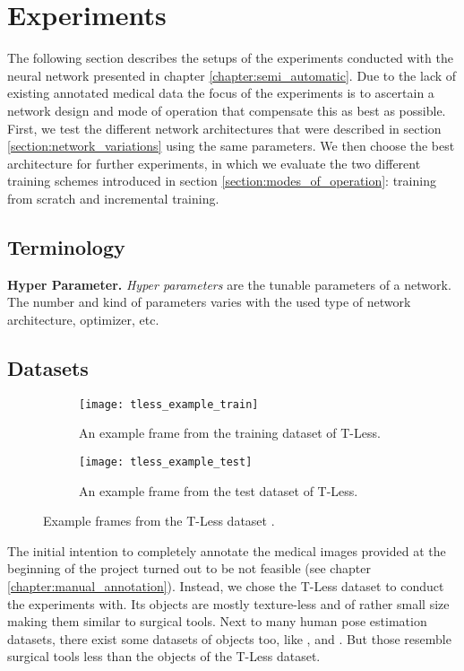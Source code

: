\chapter{Experiments} \label{chapter:experiments}

The following section describes the setups of the experiments conducted with the neural network presented in chapter \ref{chapter:semi_automatic}. Due to the lack of existing annotated medical data the focus of the experiments is to ascertain a network design and mode of operation that compensate this as best as possible. First, we test the different network architectures that were described in section \ref{section:network_variations} using the same parameters. We then choose the best architecture for further experiments, in which we evaluate the two different training schemes introduced in section \ref{section:modes_of_operation}: training from scratch and incremental training.

\section{Terminology}

\noindent\textbf{Hyper Parameter.} \textit{Hyper parameters} are the tunable parameters of a network. The number and kind of parameters varies with the used type of network architecture, optimizer, etc.

\section{Datasets}


\begin{figure}[!tbp]
	\centering
	\begin{subfigure}[t]{0.47\textwidth}
		\centering
    	\texttt{[image: tless\_example\_train]}
    	\caption{An example frame from the training dataset of T-Less.}
    	\label{fig:tless_example_train}
	\end{subfigure}
	\hfill
	\begin{subfigure}[t]{0.47\textwidth}
		\centering
    	\texttt{[image: tless\_example\_test]}
    	\caption{An example frame from the test dataset of T-Less.}
    	\label{fig:tless_example_test}
	\end{subfigure}
	\caption{Example frames from the T-Less dataset \cite{tless}.}
	\label{fig:tless_examples}
\end{figure}

The initial intention to completely annotate the medical images provided at the beginning of the project turned out to be not feasible (see chapter \ref{chapter:manual_annotation}). Instead, we chose the T-Less dataset to conduct the experiments with. Its objects are mostly texture-less  and of rather small size making them similar to surgical tools. Next to many human pose estimation datasets, there exist some datasets of objects too, like \cite{next_view_dataset}, \cite{pracsys_dataset} and \cite{rigid_body_dataset}. But those resemble surgical tools less than the objects of the T-Less dataset.

